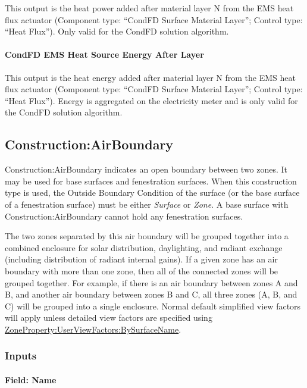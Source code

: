 This output is the heat power added after material layer N from the EMS heat flux actuator (Component type: ``CondFD Surface Material Layer''; Control type: ``Heat Flux''). Only valid for the CondFD solution algorithm.

\paragraph{CondFD EMS Heat Source Energy After Layer}

This output is the heat energy added after material layer N from the EMS heat flux actuator (Component type: ``CondFD Surface Material Layer''; Control type: ``Heat Flux''). Energy is aggregated on the electricity meter and is only valid for the CondFD solution algorithm.

\subsection{Construction:AirBoundary}\label{constructionairboundary}

Construction:AirBoundary indicates an open boundary between two zones. It may be used for base surfaces and fenestration surfaces.
When this construction type is used, the Outside Boundary Condition of the surface (or the base surface of a fenestration surface)
must be either \textit{Surface} or \textit{Zone}. A base surface with Construction:AirBoundary cannot hold any fenestration surfaces.

The two zones separated by this air boundary will be grouped together into a combined enclosure for solar distribution, daylighting, and radiant exchange (including distribution of radiant internal gains). If a given zone has an air boundary with more than one zone, then all of the connected zones will be grouped together. For example, if there is an air boundary between zones A and B, and another air boundary between zones B and C, all three zones (A, B, and C) will be grouped into a single enclosure. Normal default simplified view factors will apply unless detailed view factors are specified using \hyperref[zonepropertyuserviewfactorsbysurfacename]{ZoneProperty:UserViewFactors:BySurfaceName}.

\subsubsection{Inputs}\label{inputs-38-01}

\paragraph{Field: Name}\label{field-name-31-0001}

